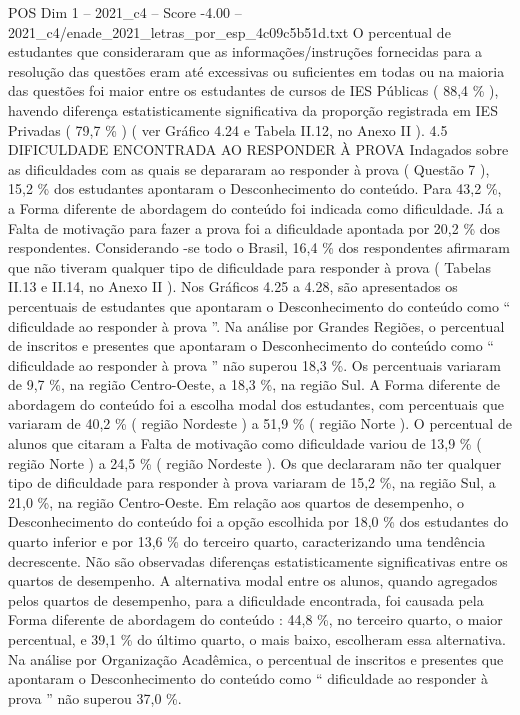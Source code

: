 \begin{textsample}{POS Dim 1 – 2021\_c4 – Score -4.00 – 2021\_c4/enade\_2021\_letras\_por\_esp\_4c09c5b51d.txt}
O percentual de estudantes que consideraram que as informações/instruções fornecidas para a resolução das questões eram até excessivas ou suficientes em todas ou na maioria das questões foi maior entre os estudantes de cursos de IES Públicas ( 88,4 \% ), havendo diferença estatisticamente significativa da proporção registrada em IES Privadas ( 79,7 \% ) ( ver Gráfico 4.24 e Tabela II.12, no Anexo II ). 4.5 DIFICULDADE ENCONTRADA AO RESPONDER À PROVA Indagados sobre as dificuldades com as quais se depararam ao responder à prova ( Questão 7 ), 15,2 \% dos estudantes apontaram o Desconhecimento do conteúdo.
Para 43,2 \%, a Forma diferente de abordagem do conteúdo foi indicada como dificuldade.
Já a Falta de motivação para fazer a prova foi a dificuldade apontada por 20,2 \% dos respondentes.
Considerando -se todo o Brasil, 16,4 \% dos respondentes afirmaram que não tiveram qualquer tipo de dificuldade para responder à prova ( Tabelas II.13 e II.14, no Anexo II ).
Nos Gráficos 4.25 a 4.28, são apresentados os percentuais de estudantes que apontaram o Desconhecimento do conteúdo como “ dificuldade ao responder à prova ”.
Na análise por Grandes Regiões, o percentual de inscritos e presentes que apontaram o Desconhecimento do conteúdo como “ dificuldade ao responder à prova ” não superou 18,3 \%.
Os percentuais variaram de 9,7 \%, na região Centro-Oeste, a 18,3 \%, na região Sul.
A Forma diferente de abordagem do conteúdo foi a escolha modal dos estudantes, com percentuais que variaram de 40,2 \% ( região Nordeste ) a 51,9 \% ( região Norte ).
O percentual de alunos que citaram a Falta de motivação como dificuldade variou de 13,9 \% ( região Norte ) a 24,5 \% ( região Nordeste ).
Os que declararam não ter qualquer tipo de dificuldade para responder à prova variaram de 15,2 \%, na região Sul, a 21,0 \%, na região Centro-Oeste.
Em relação aos quartos de desempenho, o Desconhecimento do conteúdo foi a opção escolhida por 18,0 \% dos estudantes do quarto inferior e por 13,6 \% do terceiro quarto, caracterizando uma tendência decrescente.
Não são observadas diferenças estatisticamente significativas entre os quartos de desempenho.
A alternativa modal entre os alunos, quando agregados pelos quartos de desempenho, para a dificuldade encontrada, foi causada pela Forma diferente de abordagem do conteúdo : 44,8 \%, no terceiro quarto, o maior percentual, e 39,1 \% do último quarto, o mais baixo, escolheram essa alternativa.
Na análise por Organização Acadêmica, o percentual de inscritos e presentes que apontaram o Desconhecimento do conteúdo como “ dificuldade ao responder à prova ” não superou 37,0 \%.

\end{textsample}
